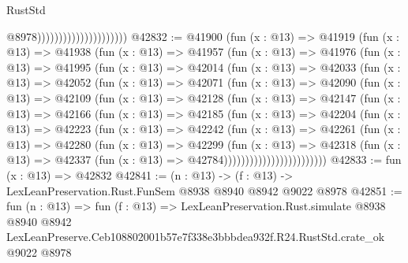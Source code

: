 \begin{lexlean}{RustStd}
\begin{coremodule}
                                              @8978)))))))))))))))))))))
@42832 := @41900
    (fun (x : @13) =>
    @41919
      (fun (x : @13) =>
      @41938
        (fun (x : @13) =>
        @41957
          (fun (x : @13) =>
          @41976
            (fun (x : @13) =>
            @41995
              (fun (x : @13) =>
              @42014
                (fun (x : @13) =>
                @42033
                  (fun (x : @13) =>
                  @42052
                    (fun (x : @13) =>
                    @42071
                      (fun (x : @13) =>
                      @42090
                        (fun (x : @13) =>
                        @42109
                          (fun (x : @13) =>
                          @42128
                            (fun (x : @13) =>
                            @42147
                              (fun (x : @13) =>
                              @42166
                                (fun (x : @13) =>
                                @42185
                                  (fun (x : @13) =>
                                  @42204
                                    (fun (x : @13) =>
                                    @42223
                                      (fun (x : @13) =>
                                      @42242
                                        (fun (x : @13) =>
                                        @42261
                                          (fun (x : @13) =>
                                          @42280
                                            (fun (x : @13) =>
                                            @42299
                                              (fun (x : @13) =>
                                              @42318
                                                (fun (x : @13) =>
                                                @42337
                                                  (fun (x : @13) => @42784))))))))))))))))))))))))
@42833 := fun (x : @13) => @42832
@42841 := (n : @13) -> (f : @13) -> LexLeanPreservation.Rust.FunSem @8938 @8940 @8942 @9022 @8978
@42851 := fun (n : @13) =>
  fun (f : @13) =>
  LexLeanPreservation.Rust.simulate
    @8938
    @8940
    @8942
    LexLeanPreserve.Ceb108802001b57e7f338e3bbbdea932f.R24.RustStd.crate_ok
    @9022
    @8978
\end{coremodule}
\end{lexlean}
